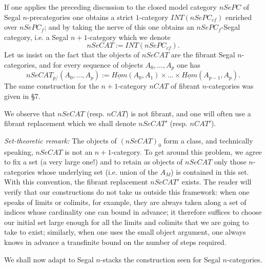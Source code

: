 If one applies the preceding discussion to the closed model category $nSePC$
of Segal $n$-precategories one obtains a strict $1$-category
$INT(nSePC_{cf})$ enriched over $nSePC_f$; and by taking the nerve of this one
obtains an $nSePC_f$-Segal category, i.e. a Segal $n+1$-category which we
denote
$$
nSeCAT:= INT(nSePC_{cf}).
$$
Let us insist on the fact that the objects of $nSeCAT$ are the fibrant Segal
$n$-categories, and for every sequence of objects $A_0,\ldots , A_p$ one has
$$
nSeCAT_{p/}(A_0,\ldots , A_p):= \underline{Hom}(A_0, A_1)\times \ldots
\times \underline{Hom}(A_{p-1}, A_p).
$$
The same construction for the $n+1$-category $nCAT$ of fibrant $n$-categories
was given in \cite{nCAT} \S 7.

We observe that $nSeCAT$ (resp. $nCAT$) is not fibrant, and one will often use
a fibrant replacement which we shall denote $nSeCAT'$ (resp. $nCAT'$).

{\em Set-theoretic remark:}
The objects of $(nSeCAT)_0$ form a class, and technically speaking, $nSeCAT$ is
not an $n+1$-category. To get around this problem, we agree to fix a set (a
very large one!) and to retain as objects of $nSeCAT$ only those $n$-categories
whose underlying set (i.e. union of the $A_M$) is contained in this set. With
this convention, the fibrant replacement $nSeCAT'$ exists. The reader will
verify that our constructions do not take us outside this framework: when one
speaks of limits or colimits, for example, they are always taken along a set of
indices whose cardinality one can bound in advance; it therefore suffices to
choose our initial set large enough for all the limits and colimits that we are
going to take to exist; similarly, when one uses the small object argument, one
always knows in advance a transfinite bound on the number of steps required.





We shall now adapt to Segal $n$-stacks the construction seen for Segal
$n$-categories.


